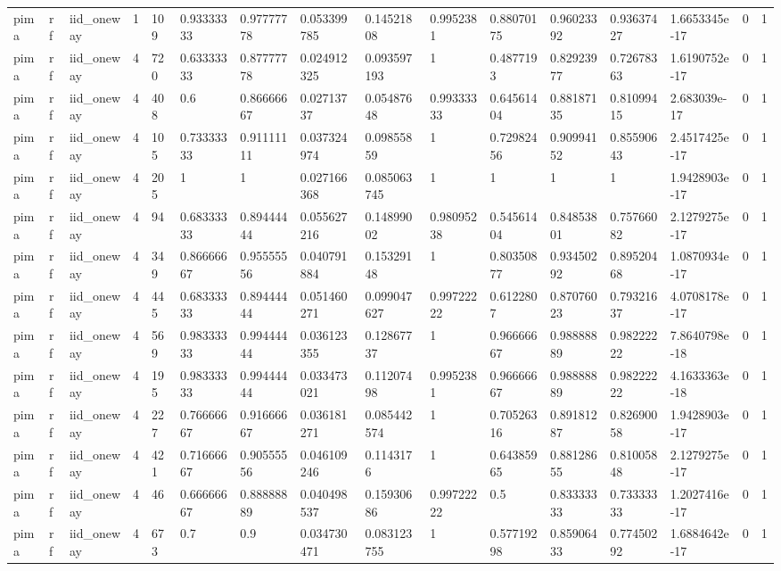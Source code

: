 \begin{tabular}{llllllllllllllll}
pima & rf & iid\_oneway & 1 & 109 & 0.93333333 & 0.97777778 & 0.053399785 & 0.14521808 & 0.9952381 & 0.88070175 & 0.96023392 & 0.93637427 & 1.6653345e-17 & 0 & 1 \\
pima & rf & iid\_oneway & 4 & 720 & 0.63333333 & 0.87777778 & 0.024912325 & 0.093597193 & 1 & 0.4877193 & 0.82923977 & 0.72678363 & 1.6190752e-17 & 0 & 1 \\
pima & rf & iid\_oneway & 4 & 408 & 0.6 & 0.86666667 & 0.02713737 & 0.05487648 & 0.99333333 & 0.64561404 & 0.88187135 & 0.81099415 & 2.683039e-17 & 0 & 1 \\
pima & rf & iid\_oneway & 4 & 105 & 0.73333333 & 0.91111111 & 0.037324974 & 0.09855859 & 1 & 0.72982456 & 0.90994152 & 0.85590643 & 2.4517425e-17 & 0 & 1 \\
pima & rf & iid\_oneway & 4 & 205 & 1 & 1 & 0.027166368 & 0.085063745 & 1 & 1 & 1 & 1 & 1.9428903e-17 & 0 & 1 \\
pima & rf & iid\_oneway & 4 & 94 & 0.68333333 & 0.89444444 & 0.055627216 & 0.14899002 & 0.98095238 & 0.54561404 & 0.84853801 & 0.75766082 & 2.1279275e-17 & 0 & 1 \\
pima & rf & iid\_oneway & 4 & 349 & 0.86666667 & 0.95555556 & 0.040791884 & 0.15329148 & 1 & 0.80350877 & 0.93450292 & 0.89520468 & 1.0870934e-17 & 0 & 1 \\
pima & rf & iid\_oneway & 4 & 445 & 0.68333333 & 0.89444444 & 0.051460271 & 0.099047627 & 0.99722222 & 0.6122807 & 0.87076023 & 0.79321637 & 4.0708178e-17 & 0 & 1 \\
pima & rf & iid\_oneway & 4 & 569 & 0.98333333 & 0.99444444 & 0.036123355 & 0.12867737 & 1 & 0.96666667 & 0.98888889 & 0.98222222 & 7.8640798e-18 & 0 & 1 \\
pima & rf & iid\_oneway & 4 & 195 & 0.98333333 & 0.99444444 & 0.033473021 & 0.11207498 & 0.9952381 & 0.96666667 & 0.98888889 & 0.98222222 & 4.1633363e-18 & 0 & 1 \\
pima & rf & iid\_oneway & 4 & 227 & 0.76666667 & 0.91666667 & 0.036181271 & 0.085442574 & 1 & 0.70526316 & 0.89181287 & 0.82690058 & 1.9428903e-17 & 0 & 1 \\
pima & rf & iid\_oneway & 4 & 421 & 0.71666667 & 0.90555556 & 0.046109246 & 0.1143176 & 1 & 0.64385965 & 0.88128655 & 0.81005848 & 2.1279275e-17 & 0 & 1 \\
pima & rf & iid\_oneway & 4 & 46 & 0.66666667 & 0.88888889 & 0.040498537 & 0.15930686 & 0.99722222 & 0.5 & 0.83333333 & 0.73333333 & 1.2027416e-17 & 0 & 1 \\
pima & rf & iid\_oneway & 4 & 673 & 0.7 & 0.9 & 0.034730471 & 0.083123755 & 1 & 0.57719298 & 0.85906433 & 0.77450292 & 1.6884642e-17 & 0 & 1 \\

\end{tabular}
